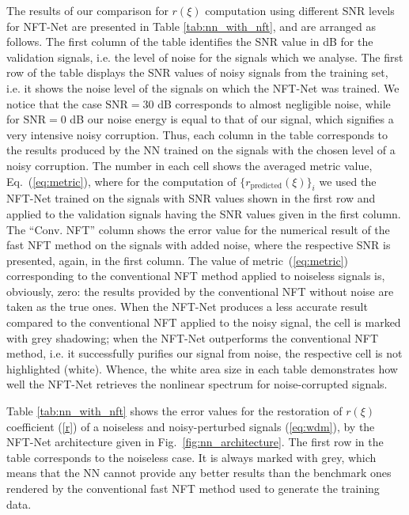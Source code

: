 The results of our comparison for $r(\xi)$ computation using different SNR levels for NFT-Net are presented in Table \ref{tab:nn_with_nft}, and are arranged as follows. The first column of the table identifies the SNR value in dB for the validation signals, i.e. the level of noise for the signals which we analyse. The first row of the table displays the SNR values of noisy signals from the training set, i.e. it shows the noise level of the signals on which the NFT-Net was trained. We notice that the case $\text{SNR}=30$ dB corresponds to almost negligible noise, while for $\text{SNR}=0$ dB our noise energy is equal to that of our signal, which signifies a very intensive noisy corruption. Thus, each column in the table corresponds to the results produced by the NN trained on the signals with the chosen level of a noisy corruption.
The number in each cell shows the averaged metric value, Eq.~(\ref{eq:metric}), where for the computation of $\{r_{\text{predicted}}(\xi)\}_{i}$ we used the NFT-Net trained on the signals with SNR values shown in the first row and applied to the validation signals having the SNR values given in the first column. The ``Conv. NFT'' column shows the error value for the numerical result of the fast NFT method on the signals with added noise, where the respective SNR is presented, again, in the first column. The value of metric~(\ref{eq:metric}) corresponding to the conventional NFT method applied to noiseless signals is, obviously, zero: the results provided by the conventional NFT without noise are taken as the true ones. 
When the NFT-Net produces a less accurate result compared to the conventional NFT applied to the noisy signal, the cell is marked with grey shadowing; when the NFT-Net outperforms the conventional NFT method, i.e. it successfully purifies our signal from noise, the respective cell is not highlighted (white). 
Whence, the white area size in each table demonstrates how well the NFT-Net retrieves the nonlinear spectrum for noise-corrupted signals.




Table \ref{tab:nn_with_nft} shows the error values for the restoration of $r(\xi)$ coefficient (\ref{r}) of a noiseless and noisy-perturbed signals (\ref{eq:wdm}), by the NFT-Net architecture given in Fig.~\ref{fig:nn_architecture}. The first row in the table corresponds to the noiseless case. It is always marked with grey, which means that the NN cannot provide any better results than the benchmark ones rendered by the conventional fast NFT method used to generate the training data. 

